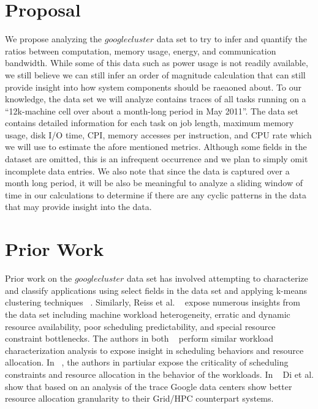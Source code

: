 \documentclass{article}
\begin{document}

\section{Proposal}

We propose analyzing the $googlecluster$ data set to try to infer and quantify the ratios between computation, memory usage, energy, and communication bandwidth. 
While some of this data such as power usage is not readily available, we still believe we can still infer an order of magnitude calculation that can still provide insight into how system components should be raeaoned about.
To our knowledge, the data set we will analyze contains traces of all tasks running on a ``12k-machine cell over about a month-long period in May 2011''.
The data set contains detailed information for each task on job length, maximum memory usage, disk I/O time, CPI, memory accesses per instruction, and CPU rate which we will use to estimate the afore mentioned metrics.
Although some fields in the dataset are omitted, this is an infrequent occurrence and we plan to simply omit incomplete data entries.
We also note that since the data is captured over a month long period, it will be also be meaningful to analyze a sliding window of time in our calculations to determine if there are any cyclic patterns in the data that may provide insight into the data.


\section{Prior Work}

Prior work on the $googlecluster$ data set has involved attempting to characterize and classify applications using select fields in the data set and applying k-means clustering techniques ~\cite{clusterdata:Di2013, clusterdata:Mishra2010}.
Similarly, Reiss et al. ~\cite{clusterdata:Reiss2012b} expose numerous insights from the data set including machine workload heterogeneity, erratic and dynamic resource availability, poor scheduling predictability, and special resource constraint bottlenecks.
The authors in both ~\cite{clusterdata:Liu2012, clusterdata:Mishra2010} perform similar workload characterization analysis to expose insight in scheduling behaviors and resource allocation.
In ~\cite{clusterdata:Lui2012}, the authors in partiular expose the criticality of scheduling constraints and resource allocation in the behavior of the workloads.
In ~\cite{clusterdata:Di2012a} Di et al. show that based on an analysis of the trace Google data centers show better resource allocation granularity to their Grid/HPC counterpart systems.
\end{document}
